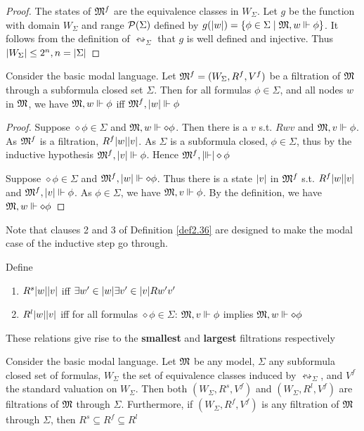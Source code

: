 \documentclass[11pt]{article}
\begin{document}
\begin{proof}
The states of \(\mathfrak{M}^f\) are the equivalence classes in \(W_\Sigma\). Let
\(g\) be the function with domain \(W_\Sigma\) and range \(\mathcal{P}(\Sigma)\)
defined by \(g(\abs{w})=\{\phi\in\Sigma\mid\fM,w\Vdash\phi\}\). It follows
from the definition of \(\leftrightsquigarrow_\Sigma\) that \(g\) is well
defined and injective. Thus \(\abs{W_\Sigma}\le 2^n,n=\abs{\Sigma}\)
\end{proof}

\begin{theorem}
Consider the basic modal language. Let \(\mathfrak{M}^f=(W_\Sigma,R^f,V^f)\) be a
filtration of \(\mathfrak{M}\) through a subformula closed set \(\Sigma\). Then for all
formulas \(\phi\in\Sigma\), and all nodes \(w\) in \(\mathfrak{M}\), we have
\(\mathfrak{M},w\Vdash\phi\) iff \(\fM^f,\abs{w}\Vdash\phi\)
\end{theorem}

\begin{proof}
Suppose \(\diamond\phi\in\Sigma\) and \(\mathfrak{M},w\Vdash\diamond\phi\). Then there
is a \(v\) s.t. \(Rwv\) and \(\mathfrak{M},v\Vdash\phi\). As \(\mathfrak{M}^f\) is a
filtration, \(R^f\abs{w}\abs{v}\). As \(\Sigma\) is a subformula closed,
\(\phi\in\Sigma\), thus by the inductive hypothesis
\(\fM^f,\abs{v}\Vdash\phi\). Hence \(\fM^f,\abs\Vdash\diamond\phi\)

Suppose \(\diamond\phi\in\Sigma\) and \(\fM^f,\abs{w}\Vdash\diamond\phi\).
Thus there is a state \(\abs{v}\) in \(\mathfrak{M}^f\) s.t. \(R^f\abs{w}\abs{v}\)
and \(\fM^f,\abs{v}\Vdash\phi\). As \(\phi\in\Sigma\), we have
\(\mathfrak{M},v\Vdash\phi\). By the definition, we have \(\mathfrak{M},w\Vdash\diamond\phi\)
\end{proof}

Note that clauses 2 and 3 of Definition \ref{def2.36} are designed to make the
modal case of the inductive step go through.

Define
\begin{enumerate}
\item \(R^s\abs{w}\abs{v}\) iff \(\exists w'\in\abs{w}\exists v'\in\abs{v}Rw'v'\)
\item \(R^l\abs{w}\abs{v}\) iff for all formulas \(\diamond\phi\in\Sigma\):
\(\mathfrak{M},v\Vdash\phi\) implies \(\mathfrak{M},w\Vdash\diamond\phi\)
\end{enumerate}


These relations give rise to the \textbf{smallest} and \textbf{largest} filtrations respectively

\begin{lemma}[]
Consider the basic modal language. Let \(\mathfrak{M}\) be any model, \(\Sigma\) any
subformula closed set of formulas, \(W_\Sigma\) the set of equivalence
classes induced by \(\leftrightsquigarrow_\Sigma\), and \(V^f\) the standard
valuation on \(W_\Sigma\). Then both \((W_\Sigma,R^s,V^f)\) and
\((W_\Sigma,R^l,V^f)\) are filtrations of \(\mathfrak{M}\) through \(\Sigma\). Furthermore, if
\((W_\Sigma, R^f,V^f)\) is any filtration of \(\mathfrak{M}\) through \(\Sigma\), then
\(R^s\subseteq R^f\subseteq R^l\)
\end{lemma}
\end{document}
